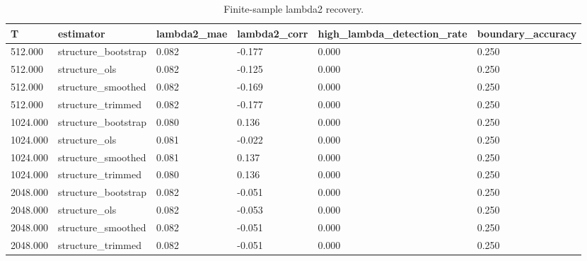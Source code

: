 \begin{table}[t]
\centering
\caption{Finite-sample lambda2 recovery.}
\label{tab:table4_identifiability}
\begin{tabular}{llllll}
\toprule
T & estimator & lambda2\_mae & lambda2\_corr & high\_lambda\_detection\_rate & boundary\_accuracy \\
\midrule
512.000 & structure\_bootstrap & 0.082 & -0.177 & 0.000 & 0.250 \\
512.000 & structure\_ols & 0.082 & -0.125 & 0.000 & 0.250 \\
512.000 & structure\_smoothed & 0.082 & -0.169 & 0.000 & 0.250 \\
512.000 & structure\_trimmed & 0.082 & -0.177 & 0.000 & 0.250 \\
1024.000 & structure\_bootstrap & 0.080 & 0.136 & 0.000 & 0.250 \\
1024.000 & structure\_ols & 0.081 & -0.022 & 0.000 & 0.250 \\
1024.000 & structure\_smoothed & 0.081 & 0.137 & 0.000 & 0.250 \\
1024.000 & structure\_trimmed & 0.080 & 0.136 & 0.000 & 0.250 \\
2048.000 & structure\_bootstrap & 0.082 & -0.051 & 0.000 & 0.250 \\
2048.000 & structure\_ols & 0.082 & -0.053 & 0.000 & 0.250 \\
2048.000 & structure\_smoothed & 0.082 & -0.051 & 0.000 & 0.250 \\
2048.000 & structure\_trimmed & 0.082 & -0.051 & 0.000 & 0.250 \\
\bottomrule
\end{tabular}
\end{table}
